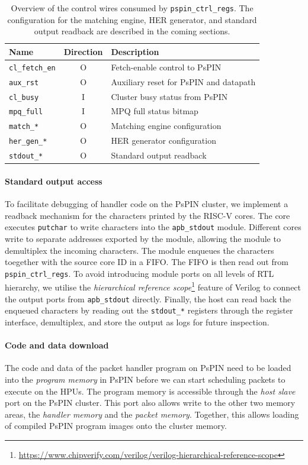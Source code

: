 \begin{table}[ht]
    \centering
    \begin{tabular}{lcl}
    \toprule
    Name & Direction & Description \\ \midrule
    \texttt{cl\_fetch\_en} & O & Fetch-enable control to PsPIN \\
    \texttt{aux\_rst} & O & Auxiliary reset for PsPIN and datapath \\
    \texttt{cl\_busy} & I & Cluster busy status from PsPIN \\
    \texttt{mpq\_full} & I & MPQ full status bitmap \\
    \texttt{match\_*} & O & Matching engine configuration \\
    \texttt{her\_gen\_*} & O & HER generator configuration \\
    \texttt{stdout\_*} & O & Standard output readback \\
    \bottomrule
    \end{tabular}
    \caption{Overview of the control wires consumed by \texttt{pspin\_ctrl\_regs}.  The configuration for the matching engine, HER generator, and standard output readback are described in the coming sections.}
    \label{tab:ctrl-signals}
\end{table}

\paragraph{Standard output access} To facilitate debugging of handler code on the PsPIN cluster, we implement a readback mechanism for the characters printed by the RISC-V cores.  The core executes \texttt{putchar} to write characters into the \texttt{apb\_stdout} module.  Different cores write to separate addresses exported by the module, allowing the module to demultiplex the incoming characters.  The module enqueues the characters toegether with the source core ID in a FIFO.  The FIFO is then read out from \texttt{pspin\_ctrl\_regs}.  To avoid introducing module ports on all levels of RTL hierarchy, we utilise the \emph{hierarchical reference scope}\footnote{\url{https://www.chipverify.com/verilog/verilog-hierarchical-reference-scope}} feature of Verilog to connect the output ports from \texttt{apb\_stdout} directly.  Finally, the host can read back the enqueued characters by reading out the \texttt{stdout\_*} registers through the register interface, demultiplex, and store the output as logs for future inspection.

\paragraph{Code and data download} The code and data of the packet handler program on PsPIN need to be loaded into the \emph{program memory} in PsPIN before we can start scheduling packets to execute on the HPUs.  The program memory is accessible through the \emph{host slave} port on the PsPIN cluster.  This port also allows write to the other two memory areas, the \emph{handler memory} and the \emph{packet memory}.  Together, this allows loading of compiled PsPIN program images onto the cluster memory.


